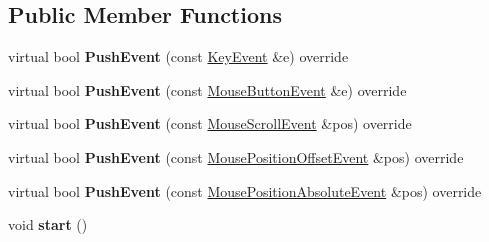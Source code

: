 \subsection*{Public Member Functions}
\begin{DoxyCompactItemize}
\item 
virtual bool {\bfseries Push\+Event} (const \hyperlink{struct_s_l_1_1_input___lite_1_1_key_event}{Key\+Event} \&e) override\hypertarget{class_s_l_1_1_input___lite_1_1_input_manager_a30db2aa7338bb433604926ff4d669ea1}{}\label{class_s_l_1_1_input___lite_1_1_input_manager_a30db2aa7338bb433604926ff4d669ea1}

\item 
virtual bool {\bfseries Push\+Event} (const \hyperlink{struct_s_l_1_1_input___lite_1_1_mouse_button_event}{Mouse\+Button\+Event} \&e) override\hypertarget{class_s_l_1_1_input___lite_1_1_input_manager_af7b785157d207b53344adf50ecdd6945}{}\label{class_s_l_1_1_input___lite_1_1_input_manager_af7b785157d207b53344adf50ecdd6945}

\item 
virtual bool {\bfseries Push\+Event} (const \hyperlink{struct_s_l_1_1_input___lite_1_1_mouse_scroll_event}{Mouse\+Scroll\+Event} \&pos) override\hypertarget{class_s_l_1_1_input___lite_1_1_input_manager_aa13962a396ea3a4b5be7bd8eb59cf646}{}\label{class_s_l_1_1_input___lite_1_1_input_manager_aa13962a396ea3a4b5be7bd8eb59cf646}

\item 
virtual bool {\bfseries Push\+Event} (const \hyperlink{struct_s_l_1_1_input___lite_1_1_mouse_position_offset_event}{Mouse\+Position\+Offset\+Event} \&pos) override\hypertarget{class_s_l_1_1_input___lite_1_1_input_manager_a9d7728002915e6cee3043b3ea2007ea4}{}\label{class_s_l_1_1_input___lite_1_1_input_manager_a9d7728002915e6cee3043b3ea2007ea4}

\item 
virtual bool {\bfseries Push\+Event} (const \hyperlink{struct_s_l_1_1_input___lite_1_1_mouse_position_absolute_event}{Mouse\+Position\+Absolute\+Event} \&pos) override\hypertarget{class_s_l_1_1_input___lite_1_1_input_manager_a7da31dca0732457098ea4452b9c38652}{}\label{class_s_l_1_1_input___lite_1_1_input_manager_a7da31dca0732457098ea4452b9c38652}

\item 
void {\bfseries start} ()\hypertarget{class_s_l_1_1_input___lite_1_1_input_manager_a281a69871f8af566aa228890fff1daaf}{}\label{class_s_l_1_1_input___lite_1_1_input_manager_a281a69871f8af566aa228890fff1daaf}

\end{DoxyCompactItemize}
